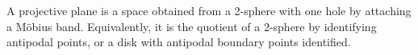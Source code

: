 A projective plane is a space obtained from a 2-sphere with one hole by attaching a Möbius band. Equivalently, it is the quotient of a 2-sphere by identifying antipodal points, or a disk with antipodal boundary points identified.
